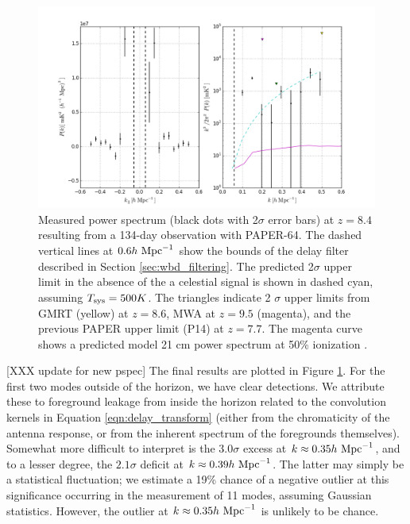 \documentclass[twocolumn,numberedappendix]{emulateapj} \shorttitle{PSA64}
\newcommand{\hMpci}{h\ {\rm Mpc}^{-1}}
\newcommand{\Tsys}{T_{\rm sys}}
\begin{document}
\begin{figure}\centering
\includegraphics[width=2\columnwidth]{plots/pk_k3pk.png}
\caption{
Measured power spectrum (black dots with 2$\sigma$ error bars) at $z=8.4$
resulting from a 134-day observation with PAPER-64.  The dashed vertical lines
at $0.6\hMpci$ show the bounds of the delay filter described in Section
\ref{sec:wbd_filtering}. The predicted 2$\sigma$ upper limit in the absence of the a celestial signal is shown in dashed cyan, assuming $\Tsys=500K$. The triangles indicate 2
$\sigma$ upper limits from GMRT \citep{paciga_et_al2011} (yellow) at $z=8.6$,
MWA \citep{dillon_et_al2013b} at $z=9.5$ (magenta), and the previous PAPER upper
limit (P14) at $z=7.7$. The magenta curve shows a predicted model 21 cm power
spectrum at 50\% ionization \citep{lidz_et_al2008}.
} \label{fig:final_pspec}
\end{figure}

[XXX update for new pspec]
The final results are plotted in Figure \ref{fig:final_pspec}.
For the first two modes outside of the horizon, we have
clear detections. We attribute these to foreground leakage from
inside the horizon related to the convolution kernels in Equation \eqref{eqn:delay_transform} (either
from the chromaticity of the antenna response, or from the inherent spectrum of the
foregrounds themselves).  Somewhat more difficult to interpret is the 
$3.0\sigma$ excess at $k\approx0.35\hMpci$, and to a lesser
degree, the $2.1\sigma$ deficit at $k\approx0.39\hMpci$.  The
latter may simply be a statistical fluctuation; we estimate a 19\% chance of 
a negative outlier at this significance occurring in the measurement of 11 modes, assuming
Gaussian statistics.  However, the outlier at $k\approx0.35\hMpci$ is
unlikely to be chance.
\end{document}
